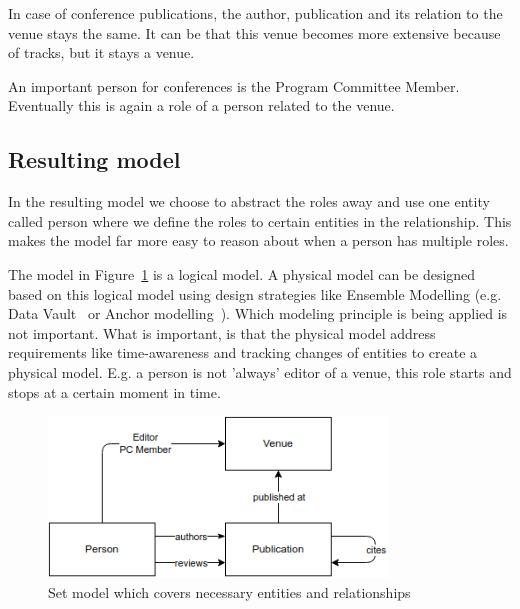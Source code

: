 \documentclass{ou-report}
\begin{document}
In case of conference publications, the author, publication and its relation to 
the venue stays the same. It can be that this venue becomes more extensive 
because of tracks, but it stays a venue.

An important person for conferences is the Program Committee Member. Eventually
this is again a role of a person related to the venue.

\subsection{Resulting model}
\label{sec:resulting_model}
In the resulting model we choose to abstract the roles away and use one entity 
called person where we define the roles to certain entities in the relationship.
This makes the model far more easy to reason about when a person has multiple 
roles.

The model in Figure~\ref{fig:resulting_model} is a logical model. A physical
model can be designed based on this logical model using design
strategies like Ensemble Modelling (e.g. Data Vault~\cite{linstedt2015building}
or Anchor modelling~\cite{ronnback2010anchor}). Which
modeling principle is being applied is not important. What is important, is that
the physical model address requirements like time-awareness and tracking changes
of entities to create a physical model. E.g. a person is not 'always' 
editor of a venue, this role starts and stops at a certain moment in time.
\begin{figure}[H]
\centering
\includegraphics[width=9cm]{images/set_model.png}
\caption{Set model which covers necessary entities and relationships}
\label{fig:resulting_model}
\end{figure}

\end{document}
